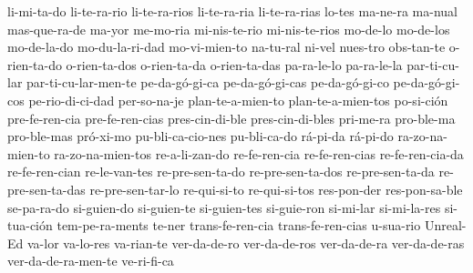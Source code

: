 {li-mi-ta-do
li-te-ra-rio
li-te-ra-rios
li-te-ra-ria
li-te-ra-rias
lo-tes
ma-ne-ra
ma-nual
mas-que-ra-de
ma-yor
me-mo-ria
mi-nis-te-rio
mi-nis-te-rios
mo-de-lo
mo-de-los
mo-de-la-do
mo-du-la-ri-dad
mo-vi-mien-to
na-tu-ral
ni-vel
nues-tro
obs-tan-te
o-rien-ta-do
o-rien-ta-dos
o-rien-ta-da
o-rien-ta-das
pa-ra-le-lo
pa-ra-le-la
par-ti-cu-lar
par-ti-cu-lar-men-te
pe-da-g\'o-gi-ca
pe-da-g\'o-gi-cas
pe-da-g\'o-gi-co
pe-da-g\'o-gi-cos
pe-rio-di-ci-dad
per-so-na-je
plan-te-a-mien-to
plan-te-a-mien-tos
po-si-ci\'on
pre-fe-ren-cia
pre-fe-ren-cias
pres-cin-di-ble
pres-cin-di-bles
pri-me-ra
pro-ble-ma
pro-ble-mas
pr\'o-xi-mo
pu-bli-ca-cio-nes
pu-bli-ca-do
r\'a-pi-da
r\'a-pi-do
ra-zo-na-mien-to
ra-zo-na-mien-tos
re-a-li-zan-do
re-fe-ren-cia
re-fe-ren-cias
re-fe-ren-cia-da
re-fe-ren-cian
re-le-van-tes
re-pre-sen-ta-do
re-pre-sen-ta-dos
re-pre-sen-ta-da
re-pre-sen-ta-das
re-pre-sen-tar-lo
re-qui-si-to
re-qui-si-tos
res-pon-der
res-pon-sa-ble
se-pa-ra-do
si-guien-do
si-guien-te
si-guien-tes
si-guie-ron
si-mi-lar
si-mi-la-res
si-tua-ci\'on
tem-pe-ra-ments
te-ner
trans-fe-ren-cia
trans-fe-ren-cias
u-sua-rio
Unreal-Ed
va-lor
va-lo-res
va-rian-te
ver-da-de-ro
ver-da-de-ros
ver-da-de-ra
ver-da-de-ras
ver-da-de-ra-men-te
ve-ri-fi-ca
}
